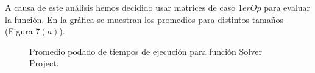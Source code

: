 A causa de este análisis hemos decidido usar matrices de caso $1erOp$ para evaluar la función. En la gráfica se muestran los promedios para distintos tamaños (Figura 7$(a)$).



\begin{figure}[htbp]
\centering


\caption{Promedio podado de tiempos de ejecución para función Solver Project.} \label{fig:lego}
\end{figure}

